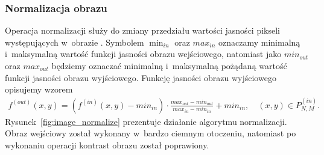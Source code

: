 \subsubsection{Normalizacja obrazu}
Operacja normalizacji służy do zmiany przedziału wartości jasności pikseli występujących w~obrazie \cite{gonzalez02}. Symbolem $\min_{in}$ oraz $max_{in}$ oznaczamy minimalną i~maksymalną wartość funkcji jasności obrazu wejściowego, natomiast jako $min_{out}$ oraz $max_{out}$ będziemy oznaczać minimalną i~maksymalną pożądaną wartość funkcji jasności obrazu wyjściowego. Funkcję jasności obrazu wyjściowego opisujemy wzorem
\begin{gather*}
  f^{(out)}(x, y) = (f^{(in)}(x, y) - min_{in}) \cdot \frac{max_{out} - min_{out}}{max_{in} - min_{in}}+min_{in}, \quad  (x, y) \in P^{(in)}_{N,M}.
\end{gather*}
Rysunek~\ref{fig:image_normalize} prezentuje działanie algorytmu normalizacji. Obraz wejściowy został wykonany w~bardzo ciemnym otoczeniu, natomiast po wykonaniu operacji kontrast obrazu został poprawiony.
